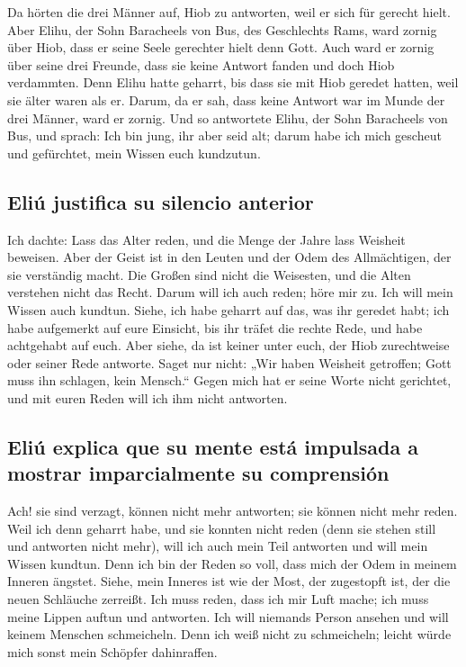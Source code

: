  Da hörten die drei Männer auf, Hiob zu antworten, weil er
sich für gerecht hielt.  Aber Elihu, der Sohn Baracheels
von Bus, des Geschlechts Rams, ward zornig über Hiob, dass er seine
Seele gerechter hielt denn Gott.  Auch ward er zornig über
seine drei Freunde, dass sie keine Antwort fanden und doch Hiob
verdammten.  Denn Elihu hatte geharrt, bis dass sie mit
Hiob geredet hatten, weil sie älter waren als er.  Darum,
da er sah, dass keine Antwort war im Munde der drei Männer, ward er
zornig.  Und so antwortete Elihu, der Sohn Baracheels von
Bus, und sprach: Ich bin jung, ihr aber seid alt; darum habe ich mich
gescheut und gefürchtet, mein Wissen euch kundzutun.

\hypertarget{eliuxfa-justifica-su-silencio-anterior}{%
\subsection{Eliú justifica su silencio
anterior}\label{eliuxfa-justifica-su-silencio-anterior}}

 Ich dachte: Lass das Alter reden, und die Menge der Jahre
lass Weisheit beweisen.  Aber der Geist ist in den Leuten
und der Odem des Allmächtigen, der sie verständig macht. 
Die Großen sind nicht die Weisesten, und die Alten verstehen nicht das
Recht.  Darum will ich auch reden; höre mir zu. Ich will
mein Wissen auch kundtun.  Siehe, ich habe geharrt auf
das, was ihr geredet habt; ich habe aufgemerkt auf eure Einsicht, bis
ihr träfet die rechte Rede,  und habe achtgehabt auf
euch. Aber siehe, da ist keiner unter euch, der Hiob zurechtweise oder
seiner Rede antworte.  Saget nur nicht: „Wir haben
Weisheit getroffen; Gott muss ihn schlagen, kein Mensch.``
 Gegen mich hat er seine Worte nicht gerichtet, und mit
euren Reden will ich ihm nicht antworten.

\hypertarget{eliuxfa-explica-que-su-mente-estuxe1-impulsada-a-mostrar-imparcialmente-su-comprensiuxf3n}{%
\subsection{Eliú explica que su mente está impulsada a mostrar
imparcialmente su
comprensión}\label{eliuxfa-explica-que-su-mente-estuxe1-impulsada-a-mostrar-imparcialmente-su-comprensiuxf3n}}

 Ach! sie sind verzagt, können nicht mehr antworten; sie
können nicht mehr reden.  Weil ich denn geharrt habe, und
sie konnten nicht reden (denn sie stehen still und antworten nicht
mehr),  will ich auch mein Teil antworten und will mein
Wissen kundtun.  Denn ich bin der Reden so voll, dass
mich der Odem in meinem Inneren ängstet.  Siehe, mein
Inneres ist wie der Most, der zugestopft ist, der die neuen Schläuche
zerreißt.  Ich muss reden, dass ich mir Luft mache; ich
muss meine Lippen auftun und antworten.  Ich will
niemands Person ansehen und will keinem Menschen schmeicheln.
 Denn ich weiß nicht zu schmeicheln; leicht würde mich
sonst mein Schöpfer dahinraffen.

